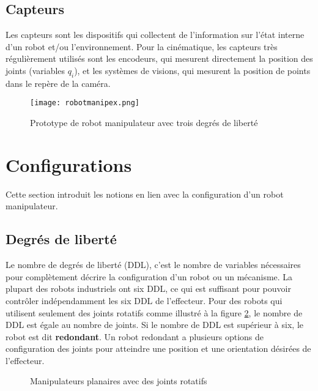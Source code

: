 \subsection{Capteurs}

Les capteurs sont les dispositifs qui collectent de l'information sur l'état interne d'un robot et/ou l’environnement. Pour la cinématique, les capteurs très régulièrement utilisés sont les encodeurs, qui mesurent directement la position des joints (variables $q_i$), et les systèmes de visions, qui mesurent la position de points dans le repère de la caméra. 


\begin{figure}[htbp]
	\centering
		\texttt{[image: robotmanipex.png]}
	\caption{Prototype de robot manipulateur avec trois degrés de liberté}
	\label{fig:robotmanipex}
\end{figure}


\section{Configurations}

Cette section introduit les notions en lien avec la configuration d'un robot manipulateur.

\subsection{Degrés de liberté}

Le nombre de degrés de liberté (DDL), c'est le nombre de variables nécessaires pour complètement décrire la configuration d'un robot ou un mécanisme. La plupart des robots industriels ont six DDL, ce qui est suffisant pour pouvoir contrôler indépendamment les six DDL de l'effecteur. Pour des robots qui utilisent seulement des joints rotatifs comme illustré à la figure \ref{fig:ddl}, le nombre de DDL est égale au nombre de joints. Si le nombre de DDL est supérieur à six, le robot est dit \textbf{redondant}. Un robot redondant a plusieurs options de configuration des joints pour atteindre une position et une orientation désirées de l'effecteur. 

\begin{figure}[H]
        \centering
        \caption{Manipulateurs planaires avec des joints rotatifs}
				\label{fig:ddl}
\end{figure}

